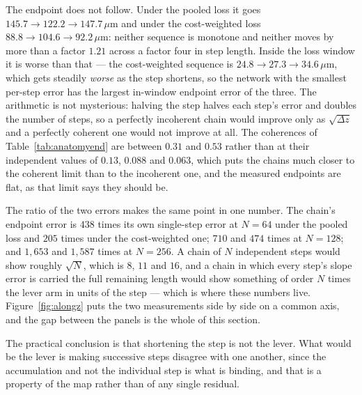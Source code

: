 \documentclass[11pt,a4paper]{article}
\newcommand{\um}{\ensuremath{\,\mu\mathrm{m}}}
\begin{document}
The endpoint does not follow. Under the pooled loss it goes $145.7 \to 122.2
\to 147.7\um$ and under the cost-weighted loss $88.8 \to 104.6 \to 92.2\um$:
neither sequence is monotone and neither moves by more than a factor $1.21$
across a factor four in step length. Inside the loss window it is worse than
that --- the cost-weighted sequence is $24.8 \to 27.3 \to 34.6\um$, which gets
steadily \emph{worse} as the step shortens, so the network with the smallest
per-step error has the largest in-window endpoint error of the three. The
arithmetic is not mysterious: halving the step halves each step's error and
doubles the number of steps, so a perfectly incoherent chain would improve only
as $\sqrt{\Delta z}$ and a perfectly coherent one would not improve at all. The
coherences of Table~\ref{tab:anatomyend} are between $0.31$ and $0.53$ rather
than at their independent values of $0.13$, $0.088$ and $0.063$, which puts the
chains much closer to the coherent limit than to the incoherent one, and the
measured endpoints are flat, as that limit says they should be.

The ratio of the two errors makes the same point in one number. The chain's
endpoint error is $438$ times its own single-step error at $N = 64$ under the
pooled loss and $205$ times under the cost-weighted one; $710$ and $474$ times
at $N = 128$; and $1{,}653$ and $1{,}587$ times at $N = 256$. A chain of $N$
independent steps would show roughly $\sqrt{N}$, which is $8$, $11$ and $16$,
and a chain in which every step's slope error is carried the full remaining
length would show something of order $N$ times the lever arm in units of the
step --- which is where these numbers live. Figure~\ref{fig:alongz} puts the two
measurements side by side on a common axis, and the gap between the panels is
the whole of this section.

The practical conclusion is that shortening the step is not the lever. What
would be the lever is making successive steps disagree with one another, since
the accumulation and not the individual step is what is binding, and that is a
property of the map rather than of any single residual.
\end{document}
